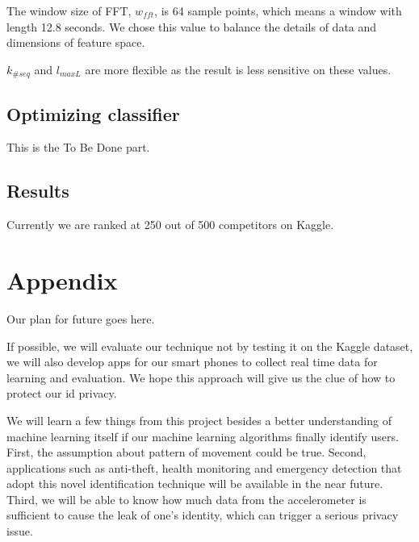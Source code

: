\documentclass{article} %
\begin{document}
The window size of FFT, $w_{fft}$, is 64 sample points, which means a window with length 12.8 seconds. We chose this value to balance the details of data and dimensions of feature space. 

$k_{\#seq}$ and  $l_{maxL}$ are more flexible as the result is less sensitive on these values.

\subsection{Optimizing classifier}
This is the To Be Done part.

\subsection{Results}

Currently we are ranked at 250 out of 500 competitors on Kaggle.

\section*{Appendix}

Our plan for future goes here.

If possible, we will evaluate our technique not by testing it on the Kaggle dataset, we will also develop apps for our smart phones to collect real time data for learning and evaluation. We hope this approach will give us the clue of how to protect our id privacy.

We will learn a few things from this project besides a better understanding of machine learning itself if our machine learning algorithms finally identify users. First, the assumption about pattern of movement could be true. Second, applications such as anti-theft, health monitoring and emergency detection that adopt this novel identification technique will be available in the near future. Third, we will be able to know how much data from the accelerometer is sufficient to cause the leak of one's identity, which can trigger a serious privacy issue.






\end{document}
